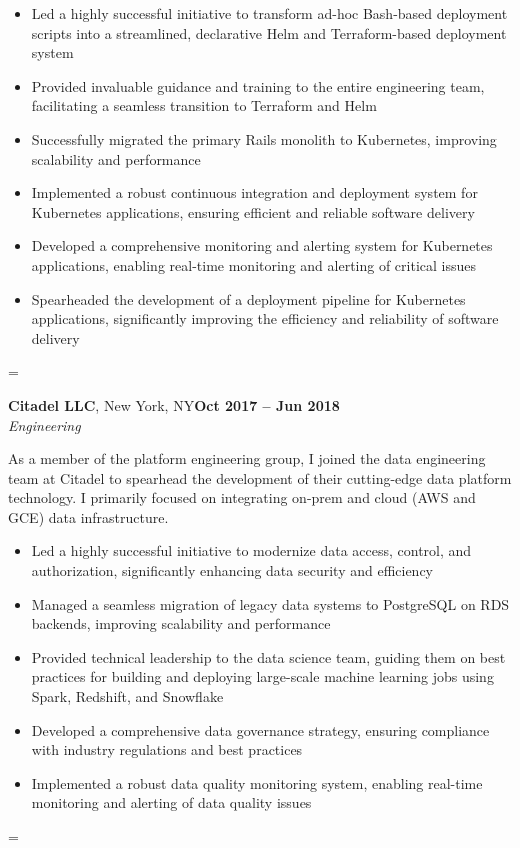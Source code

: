 \documentclass[margin,line]{resume}
\newenvironment{absolutelynopagebreak}
{\par\nobreak\vfil\penalty0\vfilneg
\vtop\bgroup}
{\par\xdef\tpd{\the\prevdepth}\egroup
\prevdepth=\tpd}
\begin{document}
\begin{resume}
\begin{absolutelynopagebreak}
\begin{itemize}
\item Led a highly successful initiative to transform ad-hoc Bash-based deployment scripts into a streamlined, declarative Helm and Terraform-based deployment system
\item Provided invaluable guidance and training to the entire engineering team, facilitating a seamless transition to Terraform and Helm
\item Successfully migrated the primary Rails monolith to Kubernetes, improving scalability and performance
\item Implemented a robust continuous integration and deployment system for Kubernetes applications, ensuring efficient and reliable software delivery
\item Developed a comprehensive monitoring and alerting system for Kubernetes applications, enabling real-time monitoring and alerting of critical issues
\item Spearheaded the development of a deployment pipeline for Kubernetes applications, significantly improving the efficiency and reliability of software delivery
\end{itemize}
\end{absolutelynopagebreak}

\vspace{5mm}

\begin{absolutelynopagebreak}
\textbf{Citadel LLC}, New York, NY\hfill \textbf{Oct 2017 -- Jun 2018}\vspace{2mm}\\\vspace{1mm}%
\textsl{Engineering}

As a member of the platform engineering group, I joined the data engineering team at Citadel to spearhead the development of their cutting-edge data platform technology. I primarily focused on integrating on-prem and cloud (AWS and GCE) data infrastructure.

\begin{itemize}
\item Led a highly successful initiative to modernize data access, control, and authorization, significantly enhancing data security and efficiency
\item Managed a seamless migration of legacy data systems to PostgreSQL on RDS backends, improving scalability and performance
\item Provided technical leadership to the data science team, guiding them on best practices for building and deploying large-scale machine learning jobs using Spark, Redshift, and Snowflake
\item Developed a comprehensive data governance strategy, ensuring compliance with industry regulations and best practices
\item Implemented a robust data quality monitoring system, enabling real-time monitoring and alerting of data quality issues
\end{itemize}
\end{absolutelynopagebreak}


\end{resume}
\end{document}
